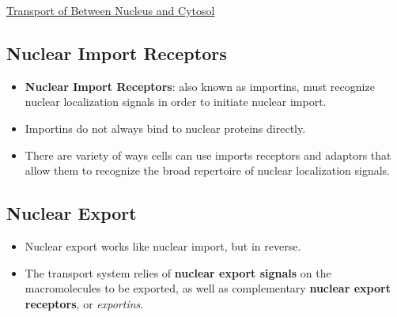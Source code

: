 \documentclass[12pt,letterpaper]{article}
\begin{document}
\begin{secbox}{\hyperlink{12}{Transport of Between Nucleus and Cytosol}}
{    \hypertarget{12.2.3}{\subsection*{Nuclear Import Receptors}}
    \begin{itemize}
        \item \textbf{Nuclear Import Receptors}: also known as importins, must recognize nuclear localization signals in order to initiate nuclear import. 
        \item Importins do not always bind to nuclear proteins directly.
        \item There are variety of ways cells can use imports receptors and adaptors that allow them to recognize the broad repertoire of nuclear localization signals. 
    \end{itemize} 

    \hypertarget{12.2.4}{\subsection*{Nuclear Export}}
    \begin{itemize}
        \item Nuclear export works like nuclear import, but in reverse.
        \item The transport system relies of \textbf{nuclear export signals} on the macromolecules to be exported, as well as complementary \textbf{nuclear export receptors}, or \textit{exportins}. 
    \end{itemize}
    
}
\end{secbox}
\end{document}

